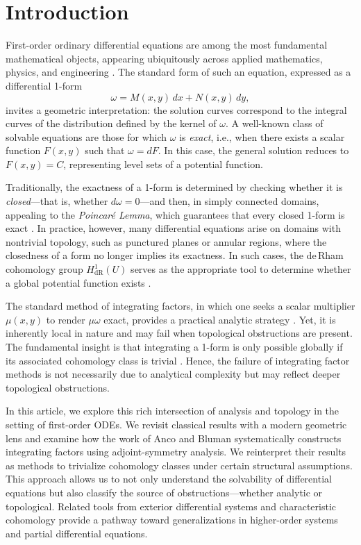 \documentclass{amsart}
\theoremstyle{definition}
\theoremstyle{remark}
\numberwithin{equation}{section}
\begin{document}
\section{Introduction}
First-order ordinary differential equations are among the most fundamental mathematical objects, appearing ubiquitously across applied mathematics, physics, and engineering \cite{BD, S}. The standard form of such an equation, expressed as a differential 1-form
\[
\omega = M(x, y)\, dx + N(x, y)\, dy,
\]
invites a geometric interpretation: the solution curves correspond to the integral curves of the distribution defined by the kernel of \( \omega \). A well-known class of solvable equations are those for which \( \omega \) is \emph{exact}, i.e., when there exists a scalar function \( F(x, y) \) such that \( \omega = dF \). In this case, the general solution reduces to \( F(x, y) = C \), representing level sets of a potential function.

Traditionally, the exactness of a 1-form is determined by checking whether it is \emph{closed}---that is, whether \( d\omega = 0 \)---and then, in simply connected domains, appealing to the \emph{Poincar\'e Lemma}, which guarantees that every closed 1-form is exact \cite{BT, W}. In practice, however, many differential equations arise on domains with nontrivial topology, such as punctured planes or annular regions, where the closedness of a form no longer implies its exactness. In such cases, the de\,Rham cohomology group \( H^1_{\text{dR}}(U) \) serves as the appropriate tool to determine whether a global potential function exists \cite{M, V}.

The standard method of integrating factors, in which one seeks a scalar multiplier \( \mu(x, y) \) to render \( \mu \omega \) exact, provides a practical analytic strategy \cite{BD, AB}. Yet, it is inherently local in nature and may fail when topological obstructions are present. The fundamental insight is that integrating a 1-form is only possible globally if its associated cohomology class is trivial \cite{BT}. Hence, the failure of integrating factor methods is not necessarily due to analytical complexity but may reflect deeper topological obstructions.

In this article, we explore this rich intersection of analysis and topology in the setting of first-order ODEs. We revisit classical results with a modern geometric lens and examine how the work of Anco and Bluman \cite{AB} systematically constructs integrating factors using adjoint-symmetry analysis. We reinterpret their results as methods to trivialize cohomology classes under certain structural assumptions. This approach allows us to not only understand the solvability of differential equations but also classify the source of obstructions---whether analytic or topological. Related tools from exterior differential systems \cite{BCGGG} and characteristic cohomology \cite{V} provide a pathway toward generalizations in higher-order systems and partial differential equations.
\end{document}
